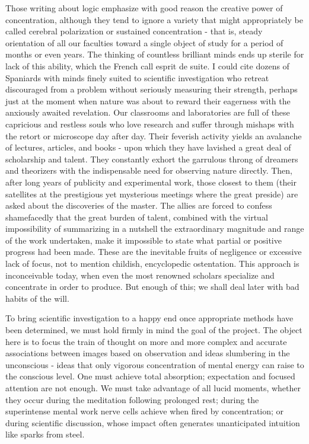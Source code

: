 \documentclass{article}
\begin{document}
Those writing about logic emphasize with good reason the creative power of concentration, although they tend to ignore a variety that might appropriately be called cerebral polarization or sustained concentration - that is, steady orientation of all our faculties toward a single object of study for a period of months or even years. The thinking of countless brilliant minds ends up sterile for lack of this ability, which the French call esprit de suite. I could cite dozens of Spaniards with minds finely suited to scientific investigation who retreat discouraged from a problem without seriously measuring their strength, perhaps just at the moment when nature was about to reward their eagerness with the anxiously awaited revelation. Our classrooms and laboratories are full of these capricious and restless souls who love research and suffer through mishaps with the retort or microscope day after day. Their feverish activity yields an avalanche of lectures, articles, and books - upon which they have lavished a great deal of scholarship and talent. They constantly exhort the garrulous throng of dreamers and theorizers with the indispensable need for observing nature directly. Then, after long years of publicity and experimental work, those closest to them (their satellites at the prestigious yet mysterious meetings where the great preside) are asked about the discoveries of the master. The allies are forced to confess shamefacedly that the great burden of talent, combined with the virtual impossibility of summarizing in a nutshell the extraordinary magnitude and range of the work undertaken, make it impossible to state what partial or positive progress had been made. These are the inevitable fruits of negligence or excessive lack of focus, not to mention childish, encyclopedic ostentation. This approach is inconceivable today, when even the most renowned scholars specialize and concentrate in order to produce. But enough of this; we shall deal later with bad habits of the will.

To bring scientific investigation to a happy end once appropriate methods have been determined, we must hold firmly in mind the goal of the project. The object here is to focus the train of thought on more and more complex and accurate associations between images based on observation and ideas slumbering in the unconscious - ideas that only vigorous concentration of mental energy can raise to the conscious level. One must achieve total absorption; expectation and focused attention are not enough. We must take advantage of all lucid moments, whether they occur during the meditation following prolonged rest; during the superintense mental work nerve cells achieve when fired by concentration; or during scientific discussion, whose impact often generates unanticipated intuition like sparks from steel.
\end{document}
